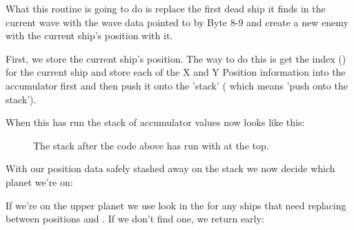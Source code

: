 %


What this routine is going to do is replace the first dead ship it finds in the current wave with the wave data pointed to by  Byte 8-9
and create a new enemy with the current ship's position with it.

First, we store the current ship's position. The way to do this is get the index () for the current ship  and store
each of the X and Y Position information into the accumulator first  and then push it onto the 'stack' ( which means
'push  onto the stack').

%


When this has run the stack of accumulator values now looks like this:

\begin{figure}[H]
  {
    \setlength{\tabcolsep}{3.0pt}
    \setlength\cmidrulewidth{\heavyrulewidth} %
    \begin{adjustbox}{width=10cm,center}
    \end{adjustbox}

  }\caption*{The stack after the code above has run with  at the top.}
\end{figure}

With our position data safely stashed away on the stack we now decide which planet we're on:

%


If we're on the upper planet we use  look in the  for any ships that
need replacing between positions  and . If we don't find one, we return early:

